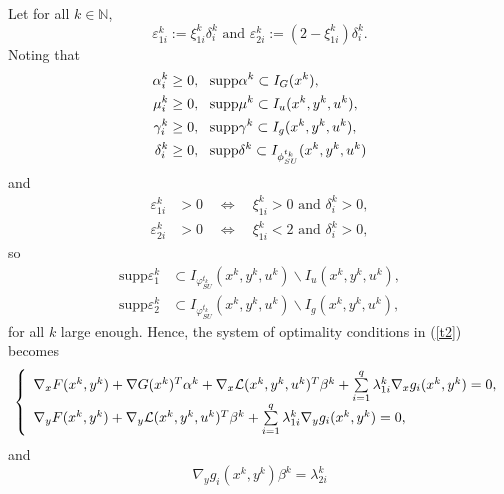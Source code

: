 	Let for all $k\in
		\mathbb{N}
	$,
	\begin{equation}
	\varepsilon_{1i}^{k}:=\xi_{1i}^{k}\delta_{i}^{k}\text{ and }\varepsilon
	_{2i}^{k}:=(2-\xi_{1i}^{k})\delta_{i}^{k}.\label{t4}
	\end{equation}
	Noting that
	\begin{align}
	\alpha_{i}^{k} &  \geq0,\text{ \ }\mathrm{supp}\alpha^{k}\subset I_{G}
	(x^{k}),\medskip\label{t6}\\
	\mu_{i}^{k} &  \geq0,\text{ \ }\mathrm{supp}\mu^{k}\subset I_{u}(x^{k}
	,y^{k},u^{k}),\medskip\label{t7}\\
	\gamma_{i}^{k} &  \geq0,\text{ \ }\mathrm{supp}\gamma^{k}\subset I_{g}
	(x^{k},y^{k},u^{k}),\medskip\label{t8}\\
	\delta_{i}^{k} &  \geq0,\text{ \ }\mathrm{supp}\delta^{k}\subset I_{\phi^{t_{k}} _{SU}
	}(x^{k},y^{k},u^{k})\label{t9}
	\end{align}
	and
	\begin{align}
	\varepsilon_{1i}^{k}  & >0 \quad \Longleftrightarrow \quad \xi_{1i}^{k}>0\text{ and }\delta
	_{i}^{k}>0,\label{t5}\\[1ex]
	\varepsilon_{2i}^{k}  & >0\quad \Longleftrightarrow \quad \xi_{1i}^{k}<2\text{ and }\delta
	_{i}^{k}>0,\label{t5*}
	\end{align}
	so
	\begin{align}
	\mathrm{supp}\varepsilon_{1}^{k}  & \subset I_{\varphi^{t_{k}} _{SU}
	}(x^{k},y^{k},u^{k})\backslash I_{u}(x^{k},y^{k},u^{k}),\label{T5}\\[1ex]
	\mathrm{supp}\varepsilon_{2}^{k}  & \subset I_{\varphi^{t_{k}} _{SU}
	}(x^{k},y^{k},u^{k})\backslash I_{g}(x^{k},y^{k},u^{k}),\label{T6}
	\end{align}
	for all $k$ large enough. Hence, the system of optimality conditions in
	(\ref{t2}) becomes
	\begin{equation}
	\left\{
	\begin{array}[c]{l}%
	\nabla_{x}F(x^{k},y^{k})+\nabla G(x^{k})^{T}\alpha^{k}+\nabla_{x}%
	\mathcal{L}(x^{k},y^{k},u^{k})^{T}\beta^{k}+\sum\limits_{i=1}^{q}\lambda
	_{1i}^{k}\nabla_{x}g_{i}(x^{k},y^{k})=0,\\[1ex]
	\nabla_{y}F(x^{k},y^{k})+\nabla_{y}\mathcal{L}(x^{k},y^{k},u^{k})^{T}\beta
	^{k}+\sum\limits_{i=1}^{q}\lambda_{1i}^{k}\nabla_{y}g_{i}(x^{k},y^{k})=0,
	\end{array}
	\right.  \label{t11}%
	\end{equation}
	and
	\begin{equation}
	\nabla_{y}g_{i}(x^{k},y^{k})\beta^{k}=\lambda_{2i}^{k}\label{T12}%
	\end{equation}
